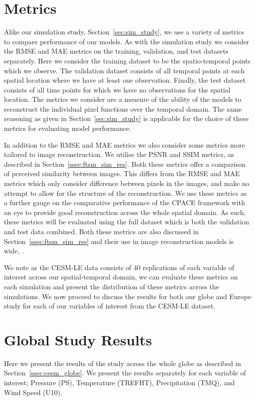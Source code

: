 \section{Metrics \label{sec:metrics_cesm}}
Alike our simulation study, Section~\ref{sec:sim_study}, we use a variety of metrics to compare performance of our models.
As with the simulation study we consider the RMSE and MAE metrics on the training, validation, and test datasets separately.
Here we consider the training dataset to be the spatio-temporal points which we observe. 
The validation dataset consists of all temporal points at each spatial location where we have at least one observation.
Finally, the test dataset consists of all time points for which we have no observations for the spatial location. 
The metrics we consider are a measure of the ability of the models to reconstruct the individual pixel functions over the temporal domain.
The same reasoning as given in Section~\ref{sec:sim_study} is applicable for the choice of these metrics for evaluating model performance.

In addition to the RMSE and MAE metrics we also consider some metrics more tailored to image reconstruction.
We utilise the PSNR  and SSIM metrics, as described in Section~\ref{ssec:ftsm_sim_res}.
Both these metrics offer a comparison of perceived similarity between images.
This differs from the RMSE and MAE metrics which only consider difference between pixels in the images, and make no attempt to allow for the structure of the reconstruction.
We use these metrics as a further gauge on the comparative performance of the CPACE framework with an eye to provide good reconstruction across the whole spatial domain.
As such, these metrics will be evaluated using the full dataset which is both the validation and test data combined. 
Both these metrics are also discussed in Section~\ref{ssec:ftsm_sim_res} and their use in image reconstruction models is wide, \citep{hore_image_2010}.

We note as the CESM-LE data consists of $40$ replications of each variable of interest across our spatial-temporal domain, we can evaluate these metrics on each simulation and present the distribution of these metrics across the simulations.
We now proceed to discuss the results for both our globe and Europe study for each of our variables of interest from the CESM-LE dataset.

\section{Global Study Results \label{sec:cesm_res}}
Here we present the results of the study across the whole globe as described in Section~\ref{ssec:cesm_globe}.
We present the results separately for each variable of interest; Pressure (PS), Temperature (TREFHT), Precipitation (TMQ), and Wind Speed (U10).


